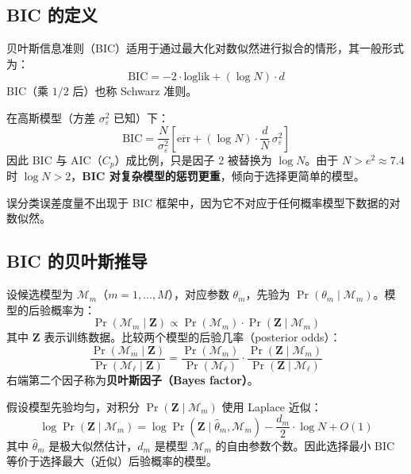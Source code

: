\subsection{BIC 的定义}

贝叶斯信息准则（BIC）适用于通过最大化对数似然进行拟合的情形，其一般形式为：
\begin{equation}\label{eq:BIC}
    \mathrm{BIC} = -2\cdot\text{loglik} + (\log N)\cdot d
\end{equation}
BIC（乘 $1/2$ 后）也称 Schwarz 准则。

在高斯模型（方差 $\sigma_\varepsilon^2$ 已知）下：
\begin{equation}\label{eq:BIC_gaussian}
    \mathrm{BIC} = \frac{N}{\sigma_\varepsilon^2}\left[\overline{\mathrm{err}} + (\log N)\cdot\frac{d}{N}\,\sigma_\varepsilon^2\right]
\end{equation}
因此 BIC 与 AIC（$C_p$）成比例，只是因子 2 被替换为 $\log N$。由于 $N > e^2 \approx 7.4$ 时 $\log N > 2$，\textbf{BIC 对复杂模型的惩罚更重}，倾向于选择更简单的模型。

\begin{remark}
    误分类误差度量不出现于 BIC 框架中，因为它不对应于任何概率模型下数据的对数似然。
\end{remark}

\subsection{BIC 的贝叶斯推导}

设候选模型为 $\mathcal{M}_m$（$m = 1,\ldots,M$），对应参数 $\theta_m$，先验为 $\Pr(\theta_m \mid \mathcal{M}_m)$。模型的后验概率为：
\begin{equation}\label{eq:posterior_model}
    \Pr(\mathcal{M}_m \mid \mathbf{Z}) \propto \Pr(\mathcal{M}_m) \cdot \Pr(\mathbf{Z} \mid \mathcal{M}_m)
\end{equation}
其中 $\mathbf{Z}$ 表示训练数据。比较两个模型的后验几率（posterior odds）：
\begin{equation}\label{eq:posterior_odds}
    \frac{\Pr(\mathcal{M}_m \mid \mathbf{Z})}{\Pr(\mathcal{M}_\ell \mid \mathbf{Z})}
    = \frac{\Pr(\mathcal{M}_m)}{\Pr(\mathcal{M}_\ell)} \cdot \frac{\Pr(\mathbf{Z} \mid \mathcal{M}_m)}{\Pr(\mathbf{Z} \mid \mathcal{M}_\ell)}
\end{equation}
右端第二个因子称为\textbf{贝叶斯因子（Bayes factor）}。

假设模型先验均匀，对积分 $\Pr(\mathbf{Z} \mid \mathcal{M}_m)$ 使用 Laplace 近似：
\begin{equation}\label{eq:laplace}
    \log\Pr(\mathbf{Z} \mid \mathcal{M}_m) = \log\Pr(\mathbf{Z} \mid \hat{\theta}_m, \mathcal{M}_m) - \frac{d_m}{2}\cdot\log N + O(1)
\end{equation}
其中 $\hat{\theta}_m$ 是极大似然估计，$d_m$ 是模型 $\mathcal{M}_m$ 的自由参数个数。因此选择最小 BIC 等价于选择最大（近似）后验概率的模型。

